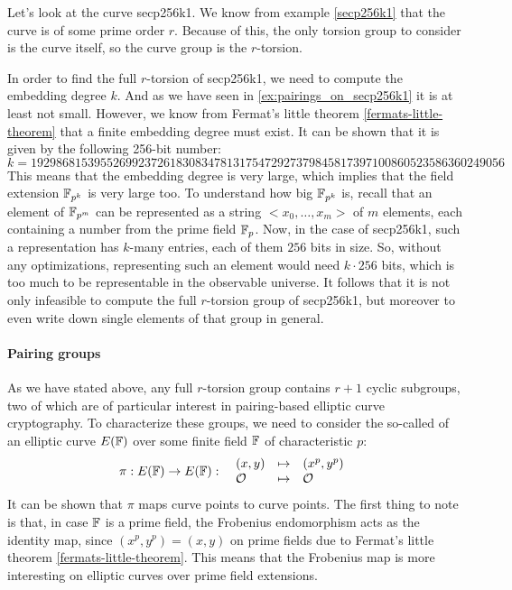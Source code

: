 \begin{example} 
\label{example:secp256k1}
Let's look at the curve secp256k1. We know from example \ref{secp256k1} that the curve is of some prime order $r$. Because of this, the only torsion group to consider is the curve itself, so the curve group is the $r$-torsion. 

In order to find the full $r$-torsion of secp256k1, we need to compute the embedding degree $k$. And as we have seen in \ref{ex:pairings_on_secp256k1} it is at least not small. However, we know from Fermat's little theorem \ref{fermats-little-theorem} that a finite embedding degree must exist. It can be shown that it is given by the following 256-bit number:
$$
k = \scriptstyle 192986815395526992372618308347813175472927379845817397100860523586360249056 
$$
This means that the embedding degree is very large, which implies that the field extension $\mathbb{F}_{p^k}$ is very large too. To understand how big $\mathbb{F}_{p^k}$ is, recall that an element of $\mathbb{F}_{p^m}$ can be represented as a string $<x_0,\ldots,x_m>$ of $m$ elements, each containing a number from the prime field $\mathbb{F}_p$. Now, in the case of secp256k1, such a representation has $k$-many entries, each of them $256$ bits in size. So, without any optimizations, representing such an element would need $k\cdot 256$ bits, which is too much to be representable in the observable universe. It follows that it is not only infeasible to compute the full $r$-torsion group of secp256k1, but moreover to even write down single elements of that group in general. 
\end{example}

\paragraph{Pairing groups}
\label{sec:pairing_groups}
 As we have stated above, any full $r$-torsion group contains $r+1$ cyclic subgroups, two of which are of particular interest in pairing-based elliptic curve cryptography. To characterize these groups, we need to consider the so-called  of an elliptic curve $E(\mathbb{F})$ over some finite field $\mathbb{F}$ of characteristic $p$:
\begin{equation}\label{eq:frobenius-enomorphism}
\pi : E(\mathbb{F}) \to E(\mathbb{F}): \;\; 
\begin{array}{lcl}
(x,y)       &\mapsto & (x^p,y^p)\\
\mathcal{O} &\mapsto & \mathcal{O}
\end{array} 
\end{equation}
It can be shown that $\pi$ maps curve points to curve points. The first thing to note is that, in case  $\mathbb{F}$ is a prime field, the Frobenius endomorphism acts as the identity map, since $(x^p,y^p) = (x,y)$ on prime fields due to Fermat's little theorem \ref{fermats-little-theorem}. This means that the Frobenius map is more interesting on elliptic curves over prime field extensions.

